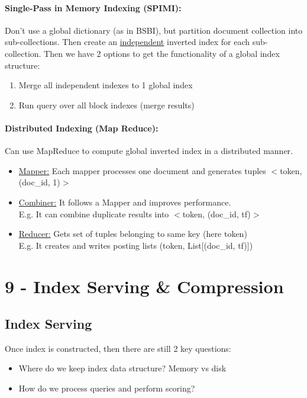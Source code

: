 \documentclass[a4paper,11pt]{article}
\newcommand{\msection}[1]{\section{#1}\vspace{-0.5mm}}
\begin{document}
\begin{multicols}{2}
\paragraph{Single-Pass in Memory Indexing (SPIMI):} Don't use a global dictionary (as in BSBI), but partition document collection into sub-collections. Then create an \underline{independent} inverted index for each sub-collection. Then we have 2 options to get the functionality of a global index structure:
\begin{enumerate}
  \item Merge all independent indexes to 1 global index
  \item Run query over all block indexes (merge results)
\end{enumerate}

\paragraph{Distributed Indexing (Map Reduce):} Can use MapReduce to compute global inverted index in a distributed manner.\\
\begin{itemize}
  \item \underline{Mapper:} Each mapper processes one document and generates tuples $<$token, (doc\_id, 1)$>$
  \item \underline{Combiner:} It follows a Mapper and improves performance.\\
        E.g. It can combine duplicate results into $<$token, (doc\_id, tf)$>$
  \item \underline{Reducer:} Gets set of tuples belonging to same key (here token)\\
        E.g. It creates and writes posting lists (token, List[(doc\_id, tf)])
\end{itemize}

\vfill
\columnbreak

\msection{9 - Index Serving \& Compression}
\subsection{Index Serving}
Once index is constructed, then there are still 2 key questions:
\begin{itemize}
  \item Where do we keep index data structure? Memory vs disk
  \item How do we process queries and perform scoring?
\end{itemize}


\end{multicols}
\end{document}
